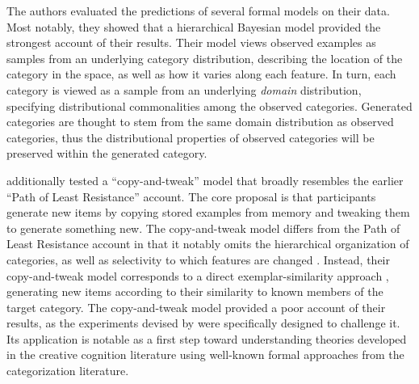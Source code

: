 \documentclass[12pt]{article}
\begin{document}
\begin{flushleft}
The authors evaluated the predictions of several formal models on their data.
Most notably, they showed that a hierarchical Bayesian model provided the
strongest account of their results. Their model views observed examples as
samples from an underlying category distribution, describing the location of the
category in the space, as well as how it varies along each feature. In turn,
each category is viewed as a sample from an underlying {\em domain}
distribution, specifying distributional commonalities among the observed
categories. Generated categories are thought to stem from the same domain
distribution as observed categories, thus the distributional properties of
observed categories will be preserved within the generated category. 

\cite{jern2013probabilistic} additionally tested a ``copy-and-tweak'' model that
broadly resembles the earlier ``Path of Least Resistance'' account. The core
proposal is that participants generate new items by copying stored examples from
memory and tweaking them to generate something new. The copy-and-tweak model
differs from the Path of Least Resistance account in that it notably omits the
hierarchical organization of categories, as well as selectivity to which
features are changed \citep[both of which are factors in the Path of Least
Resistance account;][]{ward2002role}. Instead, their copy-and-tweak model
corresponds to a direct exemplar-similarity approach
\citep[e.g.,][]{nosofsky1984choice,nosofsky1986attention}, generating new items
according to their similarity to known members of the target category. The
copy-and-tweak model provided a poor account of their results, as the
experiments devised by \citeauthor{jern2013probabilistic} were specifically
designed to challenge it. Its application is notable as a first step
toward understanding theories developed in the creative cognition literature
using well-known formal approaches from the categorization literature.


\end{flushleft}
\end{document}

